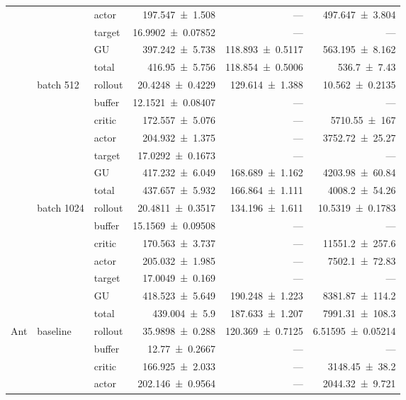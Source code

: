 {\begin{longtable}{@{}lllrrr@{}}
     &  & actor & \num{197.547+-1.508} & --- & \num{497.647+-3.804} \\
     &  & target & \num{16.9902+-0.07852} & --- & --- \\
     &  & GU & \num{397.242+-5.738} & \num{118.893+-0.5117} & \num{563.195+-8.162} \\
     &  & total & \num{416.95+-5.756} & \num{118.854+-0.5006} & \num{536.7+-7.43} \\
    \addlinespace[2pt]
     & batch 512 & rollout & \num{20.4248+-0.4229} & \num{129.614+-1.388} & \num{10.562+-0.2135} \\
     &  & buffer & \num{12.1521+-0.08407} & --- & --- \\
     &  & critic & \num{172.557+-5.076} & --- & \num{5710.55+-167} \\
     &  & actor & \num{204.932+-1.375} & --- & \num{3752.72+-25.27} \\
     &  & target & \num{17.0292+-0.1673} & --- & --- \\
     &  & GU & \num{417.232+-6.049} & \num{168.689+-1.162} & \num{4203.98+-60.84} \\
     &  & total & \num{437.657+-5.932} & \num{166.864+-1.111} & \num{4008.2+-54.26} \\
    \addlinespace[2pt]
     & batch 1024 & rollout & \num{20.4811+-0.3517} & \num{134.196+-1.611} & \num{10.5319+-0.1783} \\
     &  & buffer & \num{15.1569+-0.09508} & --- & --- \\
     &  & critic & \num{170.563+-3.737} & --- & \num{11551.2+-257.6} \\
     &  & actor & \num{205.032+-1.985} & --- & \num{7502.1+-72.83} \\
     &  & target & \num{17.0049+-0.169} & --- & --- \\
     &  & GU & \num{418.523+-5.649} & \num{190.248+-1.223} & \num{8381.87+-114.2} \\
     &  & total & \num{439.004+-5.9} & \num{187.633+-1.207} & \num{7991.31+-108.3} \\
    \addlinespace[2pt]
    \midrule
    Ant & baseline & rollout & \num{35.9898+-0.288} & \num{120.369+-0.7125} & \num{6.51595+-0.05214} \\
     &  & buffer & \num{12.77+-0.2667} & --- & --- \\
     &  & critic & \num{166.925+-2.033} & --- & \num{3148.45+-38.2} \\
     &  & actor & \num{202.146+-0.9564} & --- & \num{2044.32+-9.721} \\

\end{longtable}}
